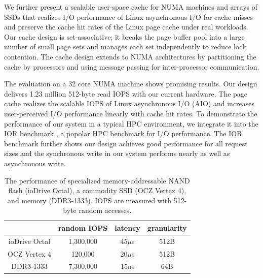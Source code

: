 We further present a scalable user-space cache for NUMA machines and
arrays of SSDs that realizes I/O
performance of Linux asynchronous I/O for cache misses and preserve the 
cache hit rates of the Linux page cache under real workloads. 
Our cache design is set-associative; it breaks
the page buffer pool into a large number of small page sets and
manages each set independently to reduce lock
contention. The cache design extends to NUMA architectures by
partitioning the cache by processors and using message passing for
inter-processor communication.

The evaluation on a 32 core NUMA machine shows promising results. Our design
delivers 1.23 million 512-byte read IOPS with our current hardware.
The page cache realizes the scalable IOPS of
Linux asynchronous I/O (AIO) and increases user-perceived I/O performance
linearly with cache hit rates. To demonstrate the performance of our system
in a typical HPC environment, we integrate it into the IOR benchmark \cite{IOR},
a popolar HPC benchmark for I/O performance. The IOR benchmark further shows
our design achieves good performance for all request sizes and the synchronous
write in our system performs nearly as well as asynchronous write.


\begin{table}
\begin{center}
\small
\begin{tabular}{|c|c|c|c|}
\hline
& random IOPS & latency & granularity \\
\hline
ioDrive Octal \cite{fusion} & 1,300,000 & 45$\mu$s &512B \\
\hline
OCZ Vertex 4 \cite{ocz} & 120,000 & 20$\mu$s & 512B \\
\hline
DDR3-1333 & 7,300,000 & 15ns & 64B \\
\hline
\end{tabular}
\normalsize
\end{center}
\caption{The performance of specialized memory-addressable NAND flash (ioDrive Octal), a commodity SSD (OCZ Vertex 4), and memory (DDR3-1333). 
IOPS are measured with 512-byte random accesses.}
\label{ssd}
\end{table}

